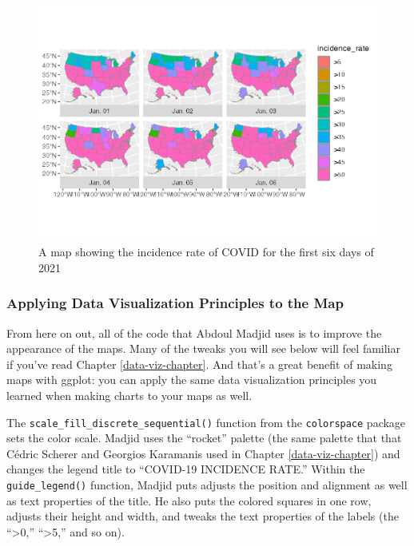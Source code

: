 \documentclass[
]{book}
\begin{document}
\begin{figure}
\includegraphics[width=1\linewidth]{maps_files/figure-latex/basic-map-1} \caption{A map showing the incidence rate of COVID for the first six days of 2021}\label{fig:basic-map}
\end{figure}

\hypertarget{applying-data-visualization-principles-to-the-map}{%
\subsubsection*{Applying Data Visualization Principles to the Map}\label{applying-data-visualization-principles-to-the-map}}

From here on out, all of the code that Abdoul Madjid uses is to improve the appearance of the maps. Many of the tweaks you will see below will feel familiar if you've read Chapter \ref{data-viz-chapter}. And that's a great benefit of making maps with ggplot: you can apply the same data visualization principles you learned when making charts to your maps as well.

The \texttt{scale\_fill\_discrete\_sequential()} function from the \texttt{colorspace} package sets the color scale. Madjid uses the ``rocket'' palette (the same palette that that Cédric Scherer and Georgios Karamanis used in Chapter \ref{data-viz-chapter}) and changes the legend title to ``COVID-19 INCIDENCE RATE.'' Within the \texttt{guide\_legend()} function, Madjid puts adjusts the position and alignment as well as text properties of the title. He also puts the colored squares in one row, adjusts their height and width, and tweaks the text properties of the labels (the ``\textgreater0,'' ``\textgreater5,'' and so on).
\end{document}
